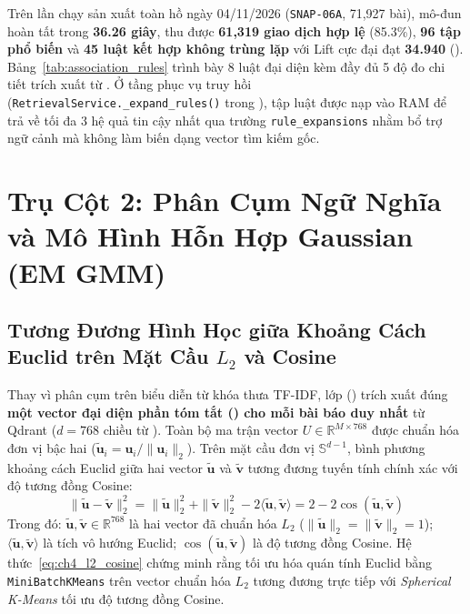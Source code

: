 Trên lần chạy sản xuất toàn hồ ngày 04/11/2026 (\texttt{SNAP-06A}, 71,927 bài), mô-đun hoàn tất trong \textbf{36.26 giây}, thu được \textbf{61,319 giao dịch hợp lệ} (85.3\%), \textbf{96 tập phổ biến} và \textbf{45 luật kết hợp không trùng lặp} với Lift cực đại đạt \textbf{34.940} (). Bảng~\ref{tab:association_rules} trình bày 8 luật đại diện kèm đầy đủ 5 độ đo chi tiết trích xuất từ . Ở tầng phục vụ truy hồi (\texttt{RetrievalService.\_expand\_rules()} trong ), tập luật được nạp vào RAM để trả về tối đa 3 hệ quả tin cậy nhất qua trường \texttt{rule\_expansions} nhằm bổ trợ ngữ cảnh mà không làm biến dạng vector tìm kiếm gốc.



\FloatBarrier
\section{Trụ Cột 2: Phân Cụm Ngữ Nghĩa và Mô Hình Hỗn Hợp Gaussian (EM GMM)}
\label{sec:ch4_clustering}

\subsection{\texorpdfstring{Tương Đương Hình Học giữa Khoảng Cách Euclid trên Mặt Cầu $L_2$ và Cosine}{Tuong Duong Hinh Hoc giua Khoang Cach Euclid tren Mat Cau L2 va Cosine}}
\label{sec:ch4_l2_sphere}

Thay vì phân cụm trên biểu diễn từ khóa thưa TF-IDF, lớp  () trích xuất đúng \textbf{một vector đại diện phần tóm tắt () cho mỗi bài báo duy nhất} từ Qdrant ($d = 768$ chiều từ ). Toàn bộ ma trận vector $U \in \mathbb{R}^{M \times 768}$ được chuẩn hóa đơn vị bậc hai ($\tilde{\mathbf{u}}_i = \mathbf{u}_i / \|\mathbf{u}_i\|_2$). Trên mặt cầu đơn vị $\mathbb{S}^{d-1}$, bình phương khoảng cách Euclid giữa hai vector $\tilde{\mathbf{u}}$ và $\tilde{\mathbf{v}}$ tương đương tuyến tính chính xác với độ tương đồng Cosine:
\begin{equation}
  \|\tilde{\mathbf{u}} - \tilde{\mathbf{v}}\|_2^2 = \|\tilde{\mathbf{u}}\|_2^2 + \|\tilde{\mathbf{v}}\|_2^2 - 2\langle \tilde{\mathbf{u}}, \tilde{\mathbf{v}} \rangle = 2 - 2 \cos(\tilde{\mathbf{u}}, \tilde{\mathbf{v}})
  \label{eq:ch4_l2_cosine}
\end{equation}
Trong đó: $\tilde{\mathbf{u}}, \tilde{\mathbf{v}} \in \mathbb{R}^{768}$ là hai vector đã chuẩn hóa $L_2$ ($\|\tilde{\mathbf{u}}\|_2 = \|\tilde{\mathbf{v}}\|_2 = 1$); $\langle \tilde{\mathbf{u}}, \tilde{\mathbf{v}} \rangle$ là tích vô hướng Euclid; $\cos(\tilde{\mathbf{u}}, \tilde{\mathbf{v}})$ là độ tương đồng Cosine. Hệ thức~\eqref{eq:ch4_l2_cosine} chứng minh rằng tối ưu hóa quán tính Euclid bằng \texttt{MiniBatchKMeans} trên vector chuẩn hóa $L_2$ tương đương trực tiếp với \textit{Spherical K-Means} tối ưu độ tương đồng Cosine.

